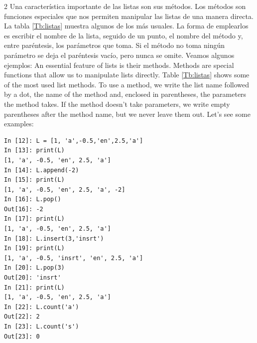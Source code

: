 \begin{paracol}{2}
Una característica importante de las listas son sus métodos. Los métodos son funciones especiales que nos permiten manipular las listas de una manera directa. La tabla \ref{Tb:listas} muestra algunos de los más usuales. La forma de emplearlos es escribir el nombre de la lista, seguido de un punto, el nombre del método y, entre paréntesis, los parámetros que toma. Si el método no toma ningún parámetro se deja el paréntesis vacío, pero nunca se omite. Veamos algunos ejemplos:
\switchcolumn
An essential feature of lists is their methods. Methods are special functions that allow us to manipulate lists directly. Table \ref{Tb:listas} shows some of the most used list methods. To use a method, we write the list name followed by a dot, the name of the method and, enclosed in parentheses, the parameters the method takes. If the method doesn't take parameters, we write empty parentheses after the method name, but we never leave them out. Let's see some examples:
\end{paracol}
\begin{center}
    \begin{minipage}{0.5\textwidth}
\begin{verbatim}
In [12]: L = [1, 'a',-0.5,'en',2.5,'a']
In [13]: print(L)
[1, 'a', -0.5, 'en', 2.5, 'a']
In [14]: L.append(-2)
In [15]: print(L)
[1, 'a', -0.5, 'en', 2.5, 'a', -2]
In [16]: L.pop()
Out[16]: -2
In [17]: print(L)
[1, 'a', -0.5, 'en', 2.5, 'a']
In [18]: L.insert(3,'insrt')
In [19]: print(L)
[1, 'a', -0.5, 'insrt', 'en', 2.5, 'a']
In [20]: L.pop(3)
Out[20]: 'insrt'
In [21]: print(L)
[1, 'a', -0.5, 'en', 2.5, 'a']
In [22]: L.count('a')
Out[22]: 2
In [23]: L.count('s')
Out[23]: 0
\end{verbatim}
    \end{minipage}
\end{center}


